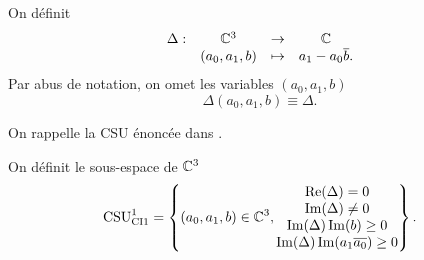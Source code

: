     On définit 
    \begin{equation}
      \label{eq:unicite:delta}
      \begin{matrix}
        \Delta: & \CC^3 &\rightarrow& \CC
        \\
        & (a_0,a_1,b) & \mapsto & a_1 - a_0\conj{b}.
      \end{matrix}
    \end{equation}
    Par abus de notation, on omet les variables \((a_0,a_1,b)\)
    \begin{equation}
       \Delta(a_0,a_1,b) \equiv \Delta.
    \end{equation}

    On rappelle la CSU énoncée dans \cite{stupfel_sufficient_2011}.

    \begin{defn}
      \label{def:csu:ci1-1}

      On définit le sous-espace de \(\CC^3\)
      \begin{equation*}
        \CSU[1]{CI1} = \left\lbrace 
        (a_0,a_1,b) \in \CC^3,
        \begin{matrix}
        \Re(\Delta) = 0
        \\
        \Im(\Delta) \not = 0
        \\
        \Im(\Delta)\Im(b) \ge 0
        \\
        \Im(\Delta )\Im(a_1\conj{a_0})\ge 0
        \end{matrix}
        \right\rbrace.
      \end{equation*}
    \end{defn}


